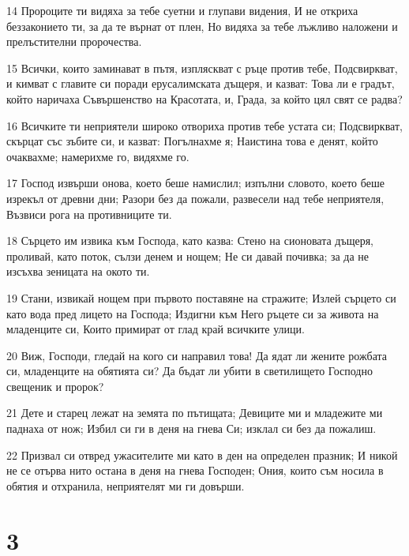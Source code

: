 \par 14 Пророците ти видяха за тебе суетни и глупави видения, И не откриха беззаконието ти, за да те върнат от плен, Но видяха за тебе лъжливо наложени и прелъстителни пророчества.
\par 15 Всички, които заминават в пътя, изпляскват с ръце против тебе, Подсвиркват, и кимват с главите си поради ерусалимската дъщеря, и казват: Това ли е градът, който наричаха Съвършенство на Красотата, и, Града, за който цял свят се радва?
\par 16 Всичките ти неприятели широко отвориха против тебе устата си; Подсвиркват, скърцат със зъбите си, и казват: Погълнахме я; Наистина това е денят, който очаквахме; намерихме го, видяхме го.
\par 17 Господ извърши онова, което беше намислил; изпълни словото, което беше изрекъл от древни дни; Разори без да пожали, развесели над тебе неприятеля, Възвиси рога на противниците ти.
\par 18 Сърцето им извика към Господа, като казва: Стено на сионовата дъщеря, проливай, като поток, сълзи денем и нощем; Не си давай почивка; за да не изсъхва зеницата на окото ти.
\par 19 Стани, извикай нощем при първото поставяне на стражите; Излей сърцето си като вода пред лицето на Господа; Издигни към Него ръцете си за живота на младенците си, Които примират от глад край всичките улици.
\par 20 Виж, Господи, гледай на кого си направил това! Да ядат ли жените рожбата си, младенците на обятията си? Да бъдат ли убити в светилището Господно свещеник и пророк?
\par 21 Дете и старец лежат на земята по пътищата; Девиците ми и младежите ми паднаха от нож; Избил си ги в деня на гнева Си; изклал си без да пожалиш.
\par 22 Призвал си отвред ужасителите ми като в ден на определен празник; И никой не се отърва нито остана в деня на гнева Господен; Ония, които съм носила в обятия и отхранила, неприятелят ми ги довърши.

\chapter{3}

